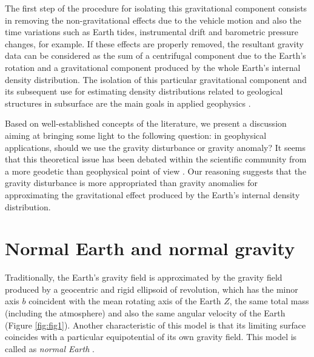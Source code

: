 \documentclass[manuscript]{geophysics}
\begin{document}
%


The first step of the procedure for isolating this 
gravitational component consists in removing the non-gravitational 
effects due to the vehicle motion and also the time variations 
such as Earth tides, instrumental drift and barometric 
pressure changes, for example.
If these effects are properly removed, the resultant 
gravity data can be considered as the sum of a 
centrifugal component due to the Earth's rotation and
a gravitational component produced by the whole Earth's
internal density distribution.
The isolation of this particular gravitational component 
and its subsequent use for estimating density 
distributions related to geological structures in subsurface 
are the main goals in applied geophysics 
\citep{blakely1996}.


Based on well-established concepts of the literature,
we present a discussion aiming at bringing some
light to the following question: in geophysical applications,
should we use the gravity disturbance or gravity anomaly?
It seems that this theoretical issue has been 
debated within the scientific community from a 
more geodetic than geophysical point of view
\citep{lafehr1991, chapin1996, li2001, fairhead2003,
hackney-featherstone2003, hinze2005}.
Our reasoning suggests that the gravity 
disturbance is more appropriated than gravity anomalies for 
approximating the gravitational effect produced by the Earth's 
internal density distribution.


\section{Normal Earth and normal gravity}


Traditionally, the Earth's gravity field is approximated 
by the gravity field produced by a geocentric and rigid ellipsoid 
of revolution, which has the minor axis $b$ 
coincident with the mean rotating axis of the Earth $Z$, the 
same total mass (including the atmosphere) and also the
same angular velocity of the Earth (Figure \ref{fig:fig1}).
Another characteristic of this model is that its
limiting surface coincides with a particular equipotential 
of its own gravity field.
This model is called as \textit{normal Earth} 
\citep{heiskanen_moritz1967, vanicek1987, hofmann-wellenhof-moritz2005,
torge2012}.
\end{document}
